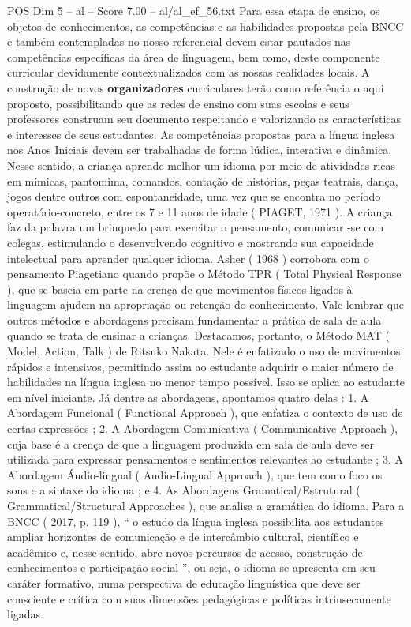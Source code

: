 \begin{textsample}{POS Dim 5 – al – Score 7.00 – al/al\_ef\_56.txt}
Para essa etapa de ensino, os objetos de conhecimentos, as competências e as habilidades propostas pela BNCC e também contempladas no nosso referencial devem estar pautados nas competências específicas da área de linguagem, bem como, deste componente curricular devidamente contextualizados com as nossas realidades locais.
A construção de novos \textbf{organizadores} curriculares terão como referência o aqui proposto, possibilitando que as redes de ensino com suas escolas e seus professores construam seu documento respeitando e valorizando as características e interesses de seus estudantes.
As competências propostas para a língua inglesa nos Anos Iniciais devem ser trabalhadas de forma lúdica, interativa e dinâmica.
Nesse sentido, a criança aprende melhor um idioma por meio de atividades ricas em mímicas, pantomima, comandos, contação de histórias, peças teatrais, dança, jogos dentre outros com espontaneidade, uma vez que se encontra no período operatório-concreto, entre os 7 e 11 anos de idade ( PIAGET, 1971 ).
A criança faz da palavra um brinquedo para exercitar o pensamento, comunicar -se com colegas, estimulando o desenvolvendo cognitivo e mostrando sua capacidade intelectual para aprender qualquer idioma.
Asher ( 1968 ) corrobora com o pensamento Piagetiano quando propõe o Método TPR ( Total Physical Response ), que se baseia em parte na crença de que movimentos físicos ligados à linguagem ajudem na apropriação ou retenção do conhecimento.
Vale lembrar que outros métodos e abordagens precisam fundamentar a prática de sala de aula quando se trata de ensinar a crianças.
Destacamos, portanto, o Método MAT ( Model, Action, Talk ) de Ritsuko Nakata.
Nele é enfatizado o uso de movimentos rápidos e intensivos, permitindo assim ao estudante adquirir o maior número de habilidades na língua inglesa no menor tempo possível.
Isso se aplica ao estudante em nível iniciante.
Já dentre as abordagens, apontamos quatro delas : 1.
A Abordagem Funcional ( Functional Approach ), que enfatiza o contexto de uso de certas expressões ; 2.
A Abordagem Comunicativa ( Communicative Approach ), cuja base é a crença de que a linguagem produzida em sala de aula deve ser utilizada para expressar pensamentos e sentimentos relevantes ao estudante ; 3.
A Abordagem Áudio-lingual ( Audio-Lingual Approach ), que tem como foco os sons e a sintaxe do idioma ; e 4.
As Abordagens Gramatical/Estrutural ( Grammatical/Structural Approaches ), que analisa a gramática do idioma.
Para a BNCC ( 2017, p. 119 ), “ o estudo da língua inglesa possibilita aos estudantes ampliar horizontes de comunicação e de intercâmbio cultural, científico e acadêmico e, nesse sentido, abre novos percursos de acesso, construção de conhecimentos e participação social ”, ou seja, o idioma se apresenta em seu caráter formativo, numa perspectiva de educação linguística que deve ser consciente e crítica com suas dimensões pedagógicas e políticas intrinsecamente ligadas.

\end{textsample}
